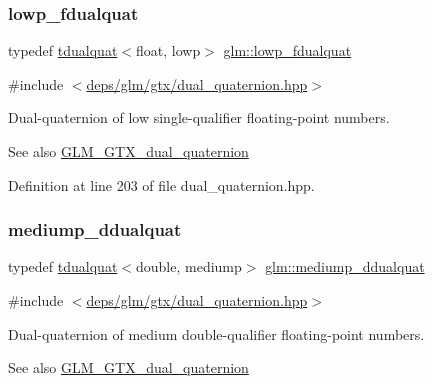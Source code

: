 \subsubsection{\texorpdfstring{lowp\+\_\+fdualquat}{lowp\_fdualquat}}
{\footnotesize\ttfamily typedef \hyperlink{structglm_1_1tdualquat}{tdualquat}$<$float, lowp$>$ \hyperlink{group__gtx__dual__quaternion_ga797f6d2679ab6773c1f057b97bf95111}{glm\+::lowp\+\_\+fdualquat}}



{\ttfamily \#include $<$\hyperlink{dual__quaternion_8hpp}{deps/glm/gtx/dual\+\_\+quaternion.\+hpp}$>$}

Dual-\/quaternion of low single-\/qualifier floating-\/point numbers.

\begin{DoxySeeAlso}{See also}
\hyperlink{group__gtx__dual__quaternion}{G\+L\+M\+\_\+\+G\+T\+X\+\_\+dual\+\_\+quaternion} 
\end{DoxySeeAlso}


Definition at line 203 of file dual\+\_\+quaternion.\+hpp.

\mbox{\label{group__gtx__dual__quaternion_ga5727116ab20b2a1d40387766d723dd6c}} 
\subsubsection{\texorpdfstring{mediump\+\_\+ddualquat}{mediump\_ddualquat}}
{\footnotesize\ttfamily typedef \hyperlink{structglm_1_1tdualquat}{tdualquat}$<$double, mediump$>$ \hyperlink{group__gtx__dual__quaternion_ga5727116ab20b2a1d40387766d723dd6c}{glm\+::mediump\+\_\+ddualquat}}



{\ttfamily \#include $<$\hyperlink{dual__quaternion_8hpp}{deps/glm/gtx/dual\+\_\+quaternion.\+hpp}$>$}

Dual-\/quaternion of medium double-\/qualifier floating-\/point numbers.

\begin{DoxySeeAlso}{See also}
\hyperlink{group__gtx__dual__quaternion}{G\+L\+M\+\_\+\+G\+T\+X\+\_\+dual\+\_\+quaternion} 
\end{DoxySeeAlso}


